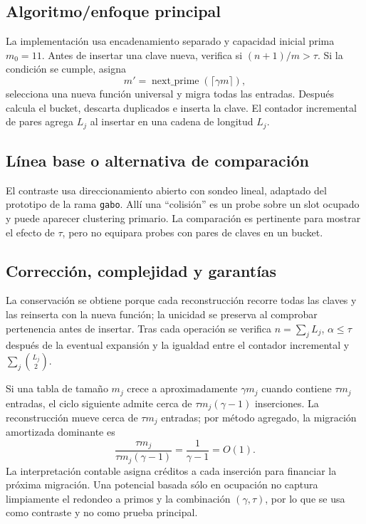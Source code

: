 \documentclass[11pt]{article}
\begin{document}
\subsection{Algoritmo/enfoque principal}
La implementación usa encadenamiento separado y capacidad inicial prima $m_0=11$. Antes de insertar una clave nueva, verifica si $(n+1)/m>\tau$. Si la condición se cumple, asigna
\[
m'=\operatorname{next\_prime}(\lceil\gamma m\rceil),
\]
selecciona una nueva función universal y migra todas las entradas. Después calcula el bucket, descarta duplicados e inserta la clave. El contador incremental de pares agrega $L_j$ al insertar en una cadena de longitud $L_j$.

\begin{center}
\end{center}

\subsection{Línea base o alternativa de comparación}
El contraste usa direccionamiento abierto con sondeo lineal, adaptado del prototipo de la rama \texttt{gabo}. Allí una ``colisión'' es un probe sobre un slot ocupado y puede aparecer clustering primario. La comparación es pertinente para mostrar el efecto de $\tau$, pero no equipara probes con pares de claves en un bucket.

\subsection{Corrección, complejidad y garantías}
La conservación se obtiene porque cada reconstrucción recorre todas las claves y las reinserta con la nueva función; la unicidad se preserva al comprobar pertenencia antes de insertar. Tras cada operación se verifica $n=\sum_j L_j$, $\alpha\le\tau$ después de la eventual expansión y la igualdad entre el contador incremental y $\sum_j\binom{L_j}{2}$.

Si una tabla de tamaño $m_j$ crece a aproximadamente $\gamma m_j$ cuando contiene $\tau m_j$ entradas, el ciclo siguiente admite cerca de $\tau m_j(\gamma-1)$ inserciones. La reconstrucción mueve cerca de $\tau m_j$ entradas; por método agregado, la migración amortizada dominante es
\[
\frac{\tau m_j}{\tau m_j(\gamma-1)}=\frac{1}{\gamma-1}=O(1).
\]
La interpretación contable asigna créditos a cada inserción para financiar la próxima migración. Una potencial basada sólo en ocupación no captura limpiamente el redondeo a primos y la combinación $(\gamma,\tau)$, por lo que se usa como contraste y no como prueba principal.
\end{document}
